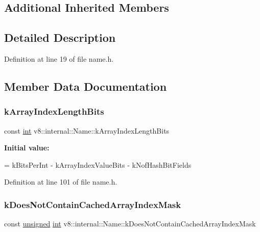 \subsection*{Additional Inherited Members}


\subsection{Detailed Description}


Definition at line 19 of file name.\+h.



\subsection{Member Data Documentation}
\mbox{\label{classv8_1_1internal_1_1Name_a3fdf5618399447d88b8c9a8c2e89339e}} 
\subsubsection{\texorpdfstring{k\+Array\+Index\+Length\+Bits}{kArrayIndexLengthBits}}
{\footnotesize\ttfamily const \mbox{\hyperlink{classint}{int}} v8\+::internal\+::\+Name\+::k\+Array\+Index\+Length\+Bits\hspace{0.3cm}{\ttfamily [static]}}

{\bfseries Initial value\+:}
\begin{DoxyCode}
=
      kBitsPerInt - kArrayIndexValueBits - kNofHashBitFields
\end{DoxyCode}


Definition at line 101 of file name.\+h.

\mbox{\label{classv8_1_1internal_1_1Name_a763fa897728f033d02c573908975f324}} 
\subsubsection{\texorpdfstring{k\+Does\+Not\+Contain\+Cached\+Array\+Index\+Mask}{kDoesNotContainCachedArrayIndexMask}}
{\footnotesize\ttfamily const \mbox{\hyperlink{classunsigned}{unsigned}} \mbox{\hyperlink{classint}{int}} v8\+::internal\+::\+Name\+::k\+Does\+Not\+Contain\+Cached\+Array\+Index\+Mask\hspace{0.3cm}{\ttfamily [static]}}

